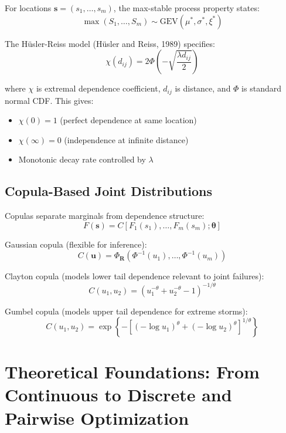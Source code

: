 \documentclass[review]{elsarticle}
\begin{document}
For locations $\mathbf{s} = (s_1, \ldots, s_m)$, the max-stable process property states:
\begin{equation}
\max(S_1, \ldots, S_m) \sim \text{GEV}(\mu^*, \sigma^*, \xi^*)
\end{equation}

The Hüsler-Reiss model (Hüsler and Reiss, 1989) specifies:
\begin{equation}
\chi(d_{ij}) = 2\Phi\left(-\sqrt{\frac{\lambda d_{ij}}{2}}\right)
\label{eq:husler_reiss}
\end{equation}

where $\chi$ is extremal dependence coefficient, $d_{ij}$ is distance, and $\Phi$ is standard normal CDF. This gives:
\begin{itemize}
\item $\chi(0) = 1$ (perfect dependence at same location)
\item $\chi(\infty) = 0$ (independence at infinite distance)
\item Monotonic decay rate controlled by $\lambda$
\end{itemize}

\subsection{Copula-Based Joint Distributions}

Copulas separate marginals from dependence structure:
\begin{equation}
F(\mathbf{s}) = C[F_1(s_1), \ldots, F_m(s_m); \boldsymbol{\theta}]
\end{equation}

Gaussian copula (flexible for inference):
\begin{equation}
C(\mathbf{u}) = \Phi_\mathbf{R}(\Phi^{-1}(u_1), \ldots, \Phi^{-1}(u_m))
\end{equation}

Clayton copula (models lower tail dependence relevant to joint failures):
\begin{equation}
C(u_1, u_2) = (u_1^{-\theta} + u_2^{-\theta} - 1)^{-1/\theta}
\end{equation}

Gumbel copula (models upper tail dependence for extreme storms):
\begin{equation}
C(u_1, u_2) = \exp\left\{-[(-\log u_1)^\theta + (-\log u_2)^\theta]^{1/\theta}\right\}
\end{equation}

\section{Theoretical Foundations: From Continuous to Discrete and Pairwise Optimization}
\end{document}
